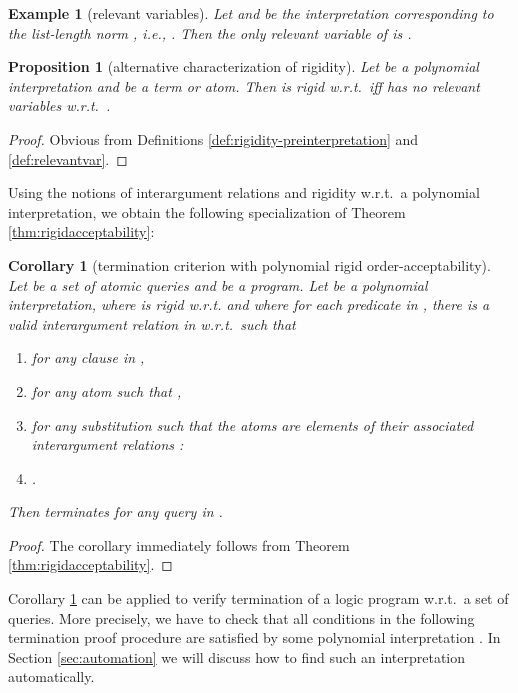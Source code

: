\documentclass[envcountsame]{tlp}
\newcounter{ex:der-lastsymconsctr}
\newtheorem{example}{Example}
\newtheorem{corollary}{Corollary}
\newtheorem{proposition}{Proposition}
\begin{document}
\begin{example}[relevant variables]
Let  and  be the interpretation corresponding to the
list-length norm ,
i.e., . Then
the only relevant variable of  is .{\hfill{}} 
\end{example}

\begin{proposition}[alternative characterization of rigidity]\label{prop:relevantvar}
Let  be a polynomial interpretation and  be a term or atom. 
Then  is rigid w.r.t.\
 iff  has no relevant variables w.r.t.\ .
\end{proposition}
\begin{proof}\label{proof:relevantvar}
Obvious from Definitions \ref{def:rigidity-preinterpretation} and  \ref{def:relevantvar}. 
\end{proof}



Using the notions of interargument relations and 
rigidity w.r.t.\ a
polynomial 
interpretation, we obtain the following specialization of Theorem
\ref{thm:rigidacceptability}: 

\begin{corollary}[termination criterion with polynomial rigid order-ac\-ceptability]
\label{prop:polynomialacceptability}
    Let  be a set of atomic queries and  be a program. Let  be a
polynomial interpretation,
where  is rigid w.r.t. 
and where for each predicate  in ,
there is a valid interargument relation 
 in  w.r.t.\
 such that 
\begin{enumerate}
    \item[-] for any clause  in ,
    \item[-] for any atom   such that ,
    \item[-] for any substitution  such that the atoms
	   are elements of their associated
interargument relations : \\
   \item[] \begin{center}.
 \end{center}
\end{enumerate}
Then  terminates for any query in  .
\end{corollary}
\begin{proof}
The corollary immediately follows from 
Theorem \ref{thm:rigidacceptability}.
\end{proof}

Corollary \ref{prop:polynomialacceptability} can be applied to verify termination of a
logic program w.r.t.\ a set of queries. More precisely, we have to check that all conditions
in the following termination proof procedure are satisfied by some polynomial interpretation 
. In Section \ref{sec:automation} we will discuss how to find such an interpretation
automatically.
\end{document}
